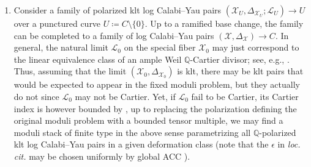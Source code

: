 \documentclass{amsart}
\theoremstyle{definition}
\theoremstyle{remark}
\numberwithin{equation}{section}
\begin{document}
\begin{enumerate}[label=(\roman*)]
\item
    Consider a family of polarized klt log Calabi--Yau pairs $(\mathcal{X}_U,\Delta_{\mathcal{X}_U};\mathcal{L}_U) \to U$ over a punctured curve $U \coloneqq C \setminus \{0\}$.
    Up to a ramified base change, the family can be completed to a family of log Calabi--Yau pairs $(\mathcal{X},\Delta_\mathcal{X}) \to C$.
    In general, the natural limit $\mathcal{L}_0$ on the special fiber $\mathcal{X}_0$ may just correspond to the linear equivalence class of an ample Weil $\mathbb Q$-Cartier divisor;
    see, e.g., \cite{KX20}.
    Thus, assuming that the limit $(\mathcal{X}_0,\Delta_{\mathcal{X}_0})$ is klt, there may be klt pairs that would be expected to appear in the fixed moduli problem, but they actually do not since $\mathcal{L}_0$ may not be Cartier. 
    Yet, if $\mathcal{L}_0$ fail to be Cartier, its Cartier index is however bounded by \cite[Thm.~1.5]{Bir23}, up to replacing the polarization defining the original moduli problem with a bounded tensor multiple, we may find a moduli stack of finite type in the above sense parametrizing all $\mathbb Q$-polarized klt log Calabi--Yau pairs in a given deformation class
    (note that the $\epsilon$ in {\it loc. cit.} may be chosen uniformly by global ACC \cite[Thm.~1.5]{HMX14}).
    
\end{enumerate} 
\end{document}
